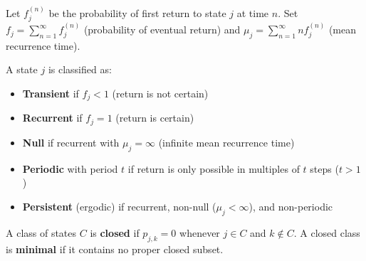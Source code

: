 Let $f_j^{(n)}$ be the probability of first return to state $j$ at time $n$. Set $f_j = \sum_{n=1}^{\infty} f_j^{(n)}$ (probability of eventual return) and $\mu_j = \sum_{n=1}^{\infty} n f_j^{(n)}$ (mean recurrence time).

A state $j$ is classified as:
\begin{itemize}
\item \textbf{Transient} if $f_j < 1$ (return is not certain)
\item \textbf{Recurrent} if $f_j = 1$ (return is certain)
\item \textbf{Null} if recurrent with $\mu_j = \infty$ (infinite mean recurrence time)
\item \textbf{Periodic} with period $t$ if return is only possible in multiples of $t$ steps ($t > 1$)
\item \textbf{Persistent} (ergodic) if recurrent, non-null ($\mu_j < \infty$), and non-periodic
\end{itemize}

A class of states $C$ is \textbf{closed} if $p_{j,k} = 0$ whenever $j \in C$ and $k \notin C$. A closed class is \textbf{minimal} if it contains no proper closed subset.
